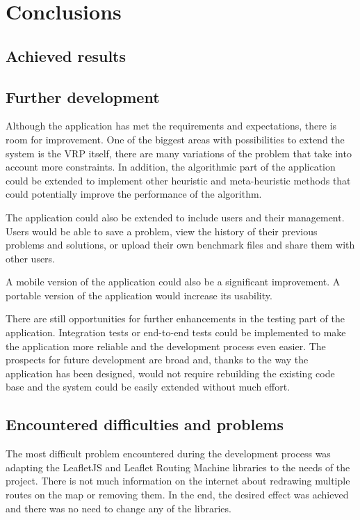\documentclass[a4paper,twoside,12pt]{book}
\begin{document}
 

\chapter{Conclusions}
\section{Achieved results}


\section{Further development}
Although the application has met the requirements and expectations, there is room for improvement. One of the biggest areas with possibilities to extend the system is the VRP itself, there are many variations of the problem that take into account more constraints. In addition, the algorithmic part of the application could be extended to implement other heuristic and meta-heuristic methods that could potentially improve the performance of the algorithm.

The application could also be extended to include users and their management. Users would be able to save a problem, view the history of their previous problems and solutions, or upload their own benchmark files and share them with other users.

A mobile version of the application could also be a significant improvement. A portable version of the application would increase its usability.

There are still opportunities for further enhancements in the testing part of the application. Integration tests or end-to-end tests could be implemented to make the application more reliable and the development process even easier.
The prospects for future development are broad and, thanks to the way the application has been designed, would not require rebuilding the existing code base and the system could be easily extended without much effort.

\section{Encountered difficulties and problems}
The most difficult problem encountered during the development process was adapting the LeafletJS and Leaflet Routing Machine libraries to the needs of the project. There is not much information on the internet about redrawing multiple routes on the map or removing them. In the end, the desired effect was achieved and there was no need to change any of the libraries. 
\end{document}
